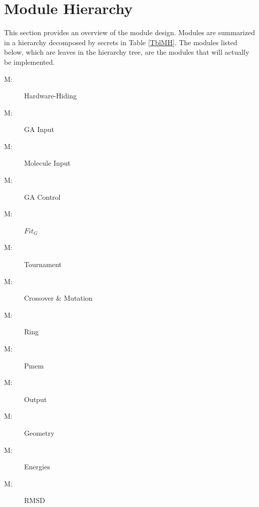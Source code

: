 \documentclass[12pt, titlepage]{article}
\newcounter{mnum}
\newcommand{\mthemnum}{M\themnum}
\begin{document}
\section{Module Hierarchy} \label{SecMH}

This section provides an overview of the module design. Modules are summarized
in a hierarchy decomposed by secrets in Table \ref{TblMH}. The modules listed
below, which are leaves in the hierarchy tree, are the modules that will
actually be implemented.

\begin{description}
\item [ \mthemnum \label{mHH}:] Hardware-Hiding
\item [ \mthemnum \label{mGAIn}:] GA Input
\item [ \mthemnum \label{mMolIn}:] Molecule Input
\item [ \mthemnum \label{mGAC}:] GA Control
\item [ \mthemnum \label{mFitg}:] $Fit_G$
\item [ \mthemnum \label{mTour}:] Tournament
\item [ \mthemnum \label{mCM}:] Crossover \& Mutation
\item [ \mthemnum \label{mRing}:] Ring
\item [ \mthemnum \label{mPmem}:] Pmem
\item [ \mthemnum \label{mOut}:] Output
\item [ \mthemnum \label{mGeometry}:] Geometry
\item [ \mthemnum \label{mE}:] Energies
\item [ \mthemnum \label{mRMSD}:] RMSD
\end{description}
\end{document}
